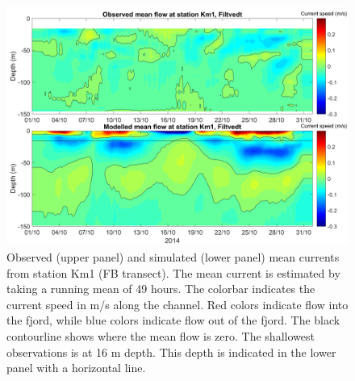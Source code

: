 \begin{figure}[htb]
	\centerline{
		\includegraphics*[trim=0 0 0 0,clip=true,width=\textwidth]{Figurer/AndreS/Km1_Obs_vs_Mod_mean_v2}}
	\caption{\small Observed (upper panel) and simulated (lower panel) mean currents from station Km1 (FB transect). The mean current is estimated by taking a running mean of 49 hours. The colorbar indicates the current speed in m/s along the channel. Red colors indicate flow into the fjord, while blue colors indicate flow out of the fjord. The black contourline shows where the mean flow is zero. The shallowest observations is at 16 m depth. This depth is indicated in the lower panel with a horizontal line.}
	\label{fig:Km1_mean}
\end{figure}

